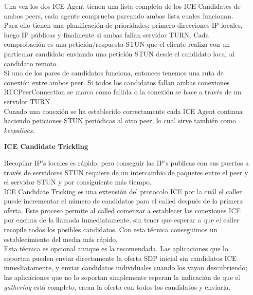 Una vez los dos ICE Agent tienen una lista completa de los ICE Candidates de ambos peers, cada agente comprueba pareando ambas lista cuales funcionan. Para ello tienen una planificación de prioridades: primero direcciones IP locales, luego IP públicas y finalmente si ambas fallan servidor TURN. Cada comprobación es una petición/respuesta STUN que el cliente realiza con un particular candidato enviando una petición STUN desde el candidato local al candidato remoto.\\

Si uno de los pares de candidatos funciona, entonces tenemos una ruta de conexión entre ambos peer. Si todos los candidatos fallan ambas conexiones RTCPeerConnection se marca como fallida o la conexión se hace a través de un servidor TURN.\\

Cuando una conexión se ha establecido correctamente cada ICE Agent continua haciendo peticiones STUN periódicas al otro peer, lo cual sirve también como \textit{keepalives}.\\

\begin{normalsize}
\noindent \textbf{ICE Candidate Trickling}\\
\end{normalsize}

Recopilar IP's locales es rápido, pero conseguir las IP's publicas con sus puertos a través de servidores STUN requiere de un intercambio de paquetes entre el peer y el servidor STUN y por consiguiente más tiempo.\\

ICE Candidate Tricking es una extensión del protocolo ICE por la cuál el caller puede incrementar el número de candidatos para el called después de la primera oferta. Este proceso permite al called comenzar a establecer las conexiones ICE por encima de la llamada inmediatamente, sin tener que esperar a que el caller recopile todos los posibles candidatos. Con esta técnica conseguimos un establecimiento del media más rápido.\\

Esta técnica es opcional aunque es la recomendada. Las aplicaciones que lo soportan pueden enviar directamente la oferta SDP inicial sin candidatos ICE inmediatamente, y enviar candidatos individuales cuando los vayan descubriendo; las aplicaciones que no lo soportan simplemente esperan la indicación de que el \textit{gathering} está completo, crean la oferta con todos los candidatos y enviarla.\\

